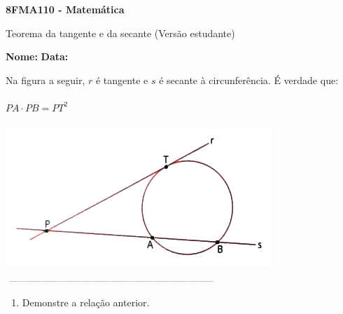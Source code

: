 \documentclass[a4paper,14pt]{article}
\begin{document}
	
	\noindent\textbf{8FMA110 - Matemática} 
	
	\begin{center}Teorema da tangente e da secante (Versão estudante)
	\end{center}
	
	\noindent\textbf{Nome:} \underline{\hspace{10cm}}
	\noindent\textbf{Data:} \underline{\hspace{4cm}}
	
    \begin{multicols}{2}
    	\noindent Na figura a seguir, $r$ é tangente e $s$ é secante à circunferência. É verdade que: \\\\
    	$PA \cdot PB = PT^2$ \\\\
 		\includegraphics[width=1\linewidth]{imagens_8FMA110/imagem1}
    	\noindent\textsubscript{~---------------------------------------------------------------------------}
    	\begin{enumerate}
    		\item Demonstre a relação anterior. \\\\\\\\\\\\\\\\\\\\\\\\\\\\\\\\\\\\\\

\end{enumerate}
\end{multicols}
\end{document}
